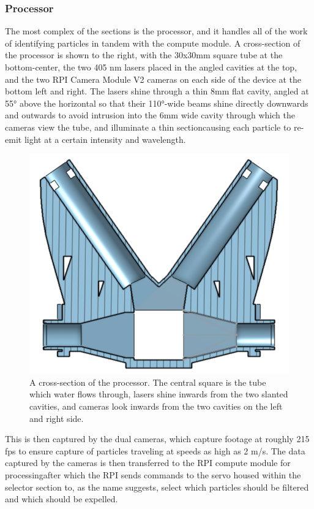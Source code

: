 \documentclass[fleqn,10pt]{SelfArx} %
\begin{document}
	\subsubsection{Processor}
	The most complex of the sections is the processor, and it handles all of the work of identifying particles in tandem with the compute module. A cross-section of the processor is shown to the right, with the 30x30mm square tube at the bottom-center, the two 405 nm lasers placed in the angled cavities at the top, and the two \gls{RPI} Camera Module V2 cameras on each side of the device at the bottom left and right. The lasers shine through a thin 8mm flat cavity, angled at 55° above the horizontal so that their 110°-wide beams shine directly downwards and outwards to avoid intrusion into the 6mm wide cavity through which the cameras view the tube, and illuminate a thin section\textemdash causing each particle to re-emit light at a certain intensity and wavelength. 
	\begin{figure}[h]
		\centering
		\includegraphics[width=1\linewidth]{Figures/ProcessorCrosssection}
		\caption[Processor Cross-section]{A cross-section of the processor. The central square is the tube which water flows through, lasers shine inwards from the two slanted cavities, and cameras look inwards from the two cavities on the left and right side.}
		\label{fig:ProcessorCrosssec}
	\end{figure}
	This is then captured by the dual cameras, which capture footage at roughly 215 fps to ensure capture of particles traveling at speeds as high as 2 m/s. The data captured by the cameras is then transferred to the \gls{RPI} compute module for processing\textemdash after which the \gls{RPI} sends commands to the servo housed within the selector section to, as the name suggests, select which particles should be filtered and which should be expelled. 
\end{document}
